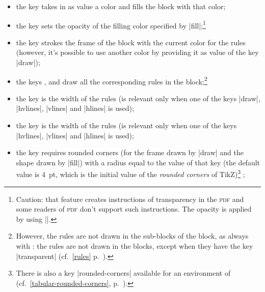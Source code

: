 \documentclass[dvipsnames]{article}
\begin{document}
\begin{itemize}
\item {}
the key  takes in as value a color and fills the block
with that color;
\item {} 
the key  sets the opacity of the filling color specified by
|fill|;\footnote{Caution: that feature creates instructions of
  transparency in the \textsc{pdf} and some readers of \textsc{pdf} don't
  support such instructions. The  opacity is applied by using |\pgfsetfillopacity|.} 
\item {}
the key  strokes the frame of the block with the current color
for the rules (however, it's possible to use another color by providing it
as value of the key |draw|);
\item {} 
the keys ,  and
 draw all the corresponding rules in the
block;\footnote{However, the rules are not drawn in the sub-blocks of the
block, as always with : the rules are not drawn in the blocks,
except when they have the key |transparent|
(cf.~\ref{rules} p.~\pageref{rules}).}
\item {}
the key  is the width of the rules (is relevant
only when one of the keys |draw|, |hvlines|, |vlines| and |hlines| is used);

\item {}
the key  is the width of the rules (is relevant
only when one of the keys |hvlines|, |vlines| and |hlines| is used);

\item \label{block-rounded-corners}
 the key 
requires rounded corners (for the frame drawn by |draw| and the shape drawn by
|fill|) with a radius equal to the value of that key (the default value is 4~pt,
which is the initial value of the \emph{rounded corners} of
TikZ)\footnote{There is also a key |rounded-corners| available for an
  environment of  (cf.~\ref{tabular-rounded-corners}, p.~\pageref{tabular-rounded-corners}).} ;
\end{itemize}
\end{document}
